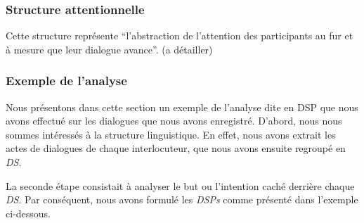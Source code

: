	\subsubsection{Structure attentionnelle}
	
		Cette structure représente “l'abstraction de l'attention des participants au fur et à mesure que leur dialogue avance”. (a détailler)
	 
	 \subsubsection{Exemple de l'analyse}
		 Nous présentons dans cette section un exemple de l'analyse dite en DSP que nous avons effectué sur les dialogues que nous avons enregistré.
		 D'abord, nous nous sommes intéressés à la structure linguistique. En effet, nous avons extrait les actes de dialogues de chaque interlocuteur, que nous avons ensuite regroupé en \emph{DS}. 
		 
		 La seconde étape consistait à analyser le but ou l'intention caché derrière chaque \emph{DS}. Par conséquent, nous avons formulé les \emph{DSPs} comme présenté dans l'exemple ci-dessous.		%
		
